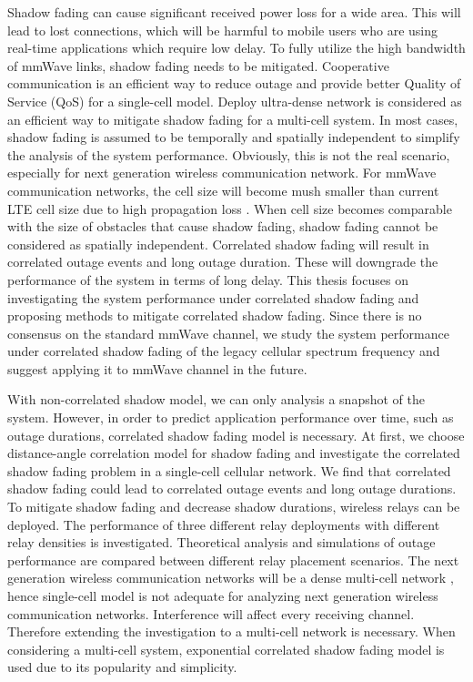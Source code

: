 \par Shadow fading can cause significant received power loss for a wide area. This will lead to lost connections, which will be harmful to mobile users who are using real-time applications which require low delay. To fully utilize the high bandwidth of mmWave links, shadow fading needs to be mitigated. Cooperative communication is an efficient way to reduce outage and provide better Quality of Service (QoS) for a single-cell model. Deploy ultra-dense network is considered as an efficient way to mitigate shadow fading for a multi-cell system. In most cases, shadow fading is assumed to be temporally and spatially independent to simplify the analysis of the system performance. Obviously, this is not the real scenario, especially for next generation wireless communication network. For mmWave communication networks, the cell size will become mush smaller than current LTE cell size due to high propagation loss \cite{rangan2014millimeter}. When cell size becomes comparable with the size of obstacles that cause shadow fading, shadow fading cannot be considered as spatially independent. Correlated shadow fading will result in correlated outage events and long outage duration. These will downgrade the performance of the system in terms of long delay. This thesis focuses on investigating the system performance under correlated shadow fading and proposing methods to mitigate correlated shadow fading. Since there is no consensus on the standard mmWave channel, we study the system performance under correlated shadow fading of the legacy cellular spectrum frequency and suggest applying it to mmWave channel in the future. 

\par With non-correlated shadow model, we can only analysis a snapshot of the system. However, in order to predict application performance over time, such as outage durations, correlated shadow fading model is necessary. At first, we choose distance-angle correlation model \cite{szyszkowicz2010feasibility} for shadow fading and investigate the correlated shadow fading problem in a single-cell cellular network. We find that correlated shadow fading could lead to correlated outage events and long outage durations.  To mitigate shadow fading and decrease shadow durations, wireless relays can be deployed. The performance of three different relay deployments with different relay densities is investigated. Theoretical analysis and simulations of outage performance are compared between different relay placement scenarios. The next generation wireless communication networks will be a dense multi-cell network \cite{rangan2014millimeter}, hence single-cell model is not adequate for analyzing next generation wireless communication networks. Interference will affect every receiving channel. Therefore extending the investigation to a multi-cell network is necessary. When considering a multi-cell system, exponential correlated shadow fading model is used due to its popularity and simplicity. 


